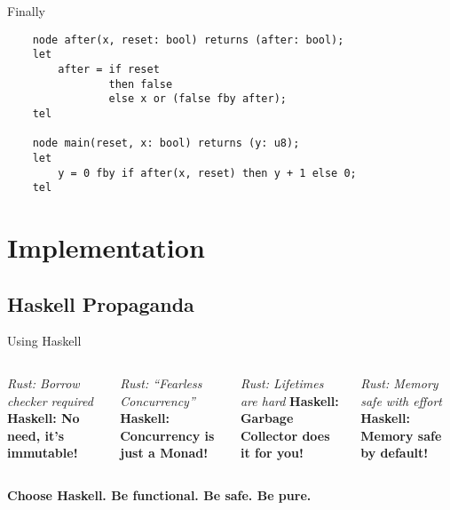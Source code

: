\documentclass{beamer}
\begin{document}
\begin{frame}[fragile]{Finally}

    \begin{verbatim}
    node after(x, reset: bool) returns (after: bool);
    let
        after = if reset
                then false
                else x or (false fby after);
    tel

    node main(reset, x: bool) returns (y: u8);
    let
        y = 0 fby if after(x, reset) then y + 1 else 0;
    tel
    \end{verbatim}
    \pause{}
\end{frame}

\section{Implementation}

\subsection{Haskell Propaganda}

\begin{frame}{Using Haskell}
    \begin{columns}
        \centering
        \textit{Rust: Borrow checker required}
        \newline
        \textbf{\large Haskell: No need, it's immutable!}

        \vspace{1cm}

        \centering
        \textit{Rust: ``Fearless Concurrency''}
        \newline
        \textbf{\large Haskell: Concurrency is just a Monad!}


        \centering
        \textit{Rust: Lifetimes are hard}
        \newline
        \textbf{\large Haskell: Garbage Collector does it for you!}

        \vspace{1cm}

        \centering
        \textit{Rust: Memory safe with effort}
        \newline
        \textbf{\large Haskell: Memory safe by default!}
    \end{columns}

    \pause{}
    \vfill
    \centering
    \textbf{\Large Choose Haskell. Be functional. Be safe. Be pure.}
\end{frame}
\end{document}
